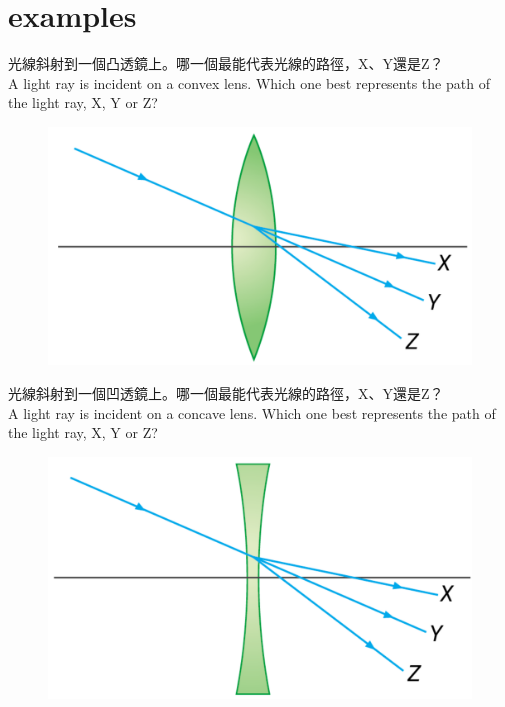 \documentclass[beamer=true]{standalone}
\begin{document}
\section{examples}

\begin{eg}
    光線斜射到一個凸透鏡上。哪一個最能代表光線的路徑，X、Y還是Z？\\A light ray is incident on a convex lens. Which one best represents the path of the light ray, X, Y or Z?
    \bigskip
    \begin{figure}
        \centering
        \includegraphics[width=0.65\linewidth]{assets/81xne89nu12.png}


    \end{figure}
\end{eg}

\begin{eg}
    光線斜射到一個凹透鏡上。哪一個最能代表光線的路徑，X、Y還是Z？\\A light ray is incident on a concave lens. Which one best represents the path of the light ray, X, Y or Z?
    \bigskip
    \begin{figure}
        \centering
        \includegraphics[width=0.65\linewidth]{assets/xn9eu19eud.png}


    \end{figure}
\end{eg}
\end{document}
